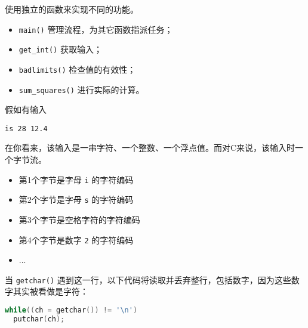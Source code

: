 \begin{frame}[fragile]
使用独立的函数来实现不同的功能。 \vspace{0.1in}

\begin{itemize}
\item \lstinline|main()| 管理流程，为其它函数指派任务；\\[0.1in]
\item \lstinline|get_int()| 获取输入；\\[0.1in]
\item \lstinline|badlimits()| 检查值的有效性；\\[0.1in]
\item \lstinline|sum_squares()| 进行实际的计算。

\end{itemize}
\end{frame}

\begin{frame}[fragile]
假如有输入
\begin{lstlisting}
is 28 12.4
\end{lstlisting}
在你看来，该输入是一串字符、一个整数、一个浮点值。而对C来说，该输入时一个字节流。\vspace{0.1in}

\begin{itemize}
\item 第1个字节是字母 \lstinline|i| 的字符编码\\[0.1in]
\item 第2个字节是字母 \lstinline|s| 的字符编码\\[0.1in]
\item 第3个字节是空格字符的字符编码\\[0.1in]
\item 第4个字节是数字 \lstinline|2| 的字符编码\\[0.1in]
\item ...
\end{itemize}
\end{frame}

\begin{frame}[fragile]
当 \lstinline|getchar()| 遇到这一行，以下代码将读取并丢弃整行，包括数字，因为这些数字其实被看做是字符：
\begin{lstlisting}[language=c]
while((ch = getchar()) != '\n')
  putchar(ch);
\end{lstlisting}
\end{frame}

